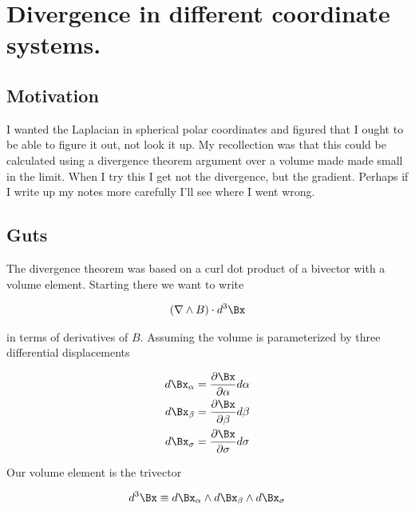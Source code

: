 

\chapter{Divergence in different coordinate systems.}
\label{chap:gradientAltCoord}
{}
\date{Aug 22, 2009}

\beginArtWithToc

\section{Motivation}

I wanted the Laplacian in spherical polar coordinates and figured that I ought to be able to figure it out, not look it up.  My recollection was that this could be calculated using a divergence theorem argument over a volume made made small in the limit.  When I try this I get not the divergence, but the gradient.  Perhaps if I write up my notes more carefully I'll see where I went wrong.

\section{Guts}

The  divergence theorem was based on a curl dot product of a bivector with a volume element.  Starting there we want to write

\begin{align}\label{eqn:foo1}
(\grad \wedge B) \cdot d^3 \Bx
\end{align}

in terms of derivatives of $B$.  Assuming the volume is parameterized by three differential displacements

\begin{align*}
d\Bx_\alpha &= \PD{\alpha}{\Bx} d\alpha \\
d\Bx_\beta &= \PD{\beta}{\Bx} d\beta \\
d\Bx_\sigma &= \PD{\sigma}{\Bx} d\sigma
\end{align*}

Our volume element is the trivector

\begin{align}\label{eqn:foo2}
d^3 \Bx \equiv d\Bx_\alpha  \wedge d\Bx_\beta  \wedge d\Bx_\sigma
\end{align}

